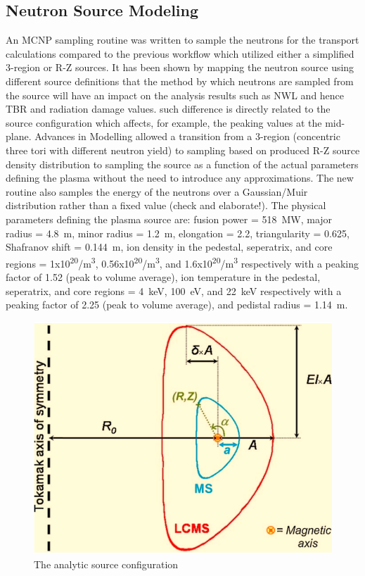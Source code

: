 \documentclass[12pt, letterpaper]{elsarticle}
\begin{document}
\subsection{Neutron Source Modeling} \label{Neutron Source Modelling}
An MCNP sampling routine was written to sample the neutrons for the transport calculations compared to the previous workflow which utilized either a simplified 3-region or R-Z sources. It has been shown by mapping the neutron source using different source definitions that the method by which neutrons are sampled from the source will have an impact on the analysis results such as NWL and hence TBR and radiation damage values. such difference is directly related to the source configuration which affects, for example, the peaking values at the mid-plane. Advances in Modelling allowed a transition from a 3-region (concentric three tori with different neutron yield) to sampling based on produced R-Z source density distribution to sampling the source as a function of the actual parameters defining the plasma without the need to introduce any approximations. The new routine also samples the energy of the neutrons over a Gaussian/Muir distribution rather than a fixed value (check and elaborate!). 
The physical parameters defining the plasma source \cite{ref_11} are: fusion power = \SI{518}{MW}, major radius = \SI{4.8}{m}, minor radius = \SI{1.2}{m}, elongation = 2.2, triangularity = 0.625, Shafranov shift = \SI{0.144}{m}, ion density in the pedestal, seperatrix, and core regions = 1x10\textsuperscript{20}/m\textsuperscript{3}, 0.56x10\textsuperscript{20}/m\textsuperscript{3}, and 1.6x10\textsuperscript{20}/m\textsuperscript{3} respectively with a peaking factor of 1.52 (peak to volume average), ion temperature in the pedestal, seperatrix, and core regions  = \SI{4}{keV}, \SI{100}{eV}, and \SI{22}{keV} respectively with a peaking factor of 2.25 (peak to volume average), and pedistal radius = \SI{1.14}{m}.
\begin{figure}[h!]
  \centering
  \includegraphics[scale=0.2]{../plots/Analytic_source.png}
  \caption{The analytic source configuration}
  \label{fig:Analytic_source}
\end{figure}
\end{document}
